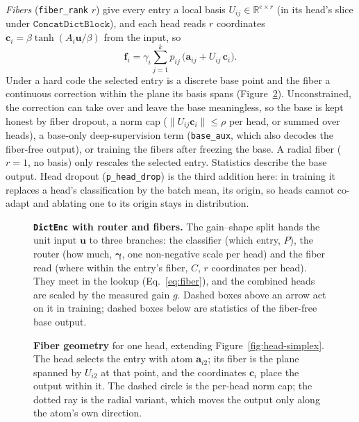 \emph{Fibers} (\texttt{fiber\_rank} $r$) give every entry a local basis
$U_{ij} \in \mathbb{R}^{e \times r}$ (in its head's slice under
$\mathtt{ConcatDictBlock}$), and each head reads $r$ coordinates
$\mathbf{c}_i = \beta\tanh(A_i\mathbf{u}/\beta)$ from the input, so
\begin{equation}
	\mathbf{f}_i = \gamma_i \sum^{k}_{j=1} p_{ij}\,\big(\mathbf{a}_{ij}
	      + U_{ij}\,\mathbf{c}_i\big).
	\label{eq:fiber}
\end{equation}
Under a hard code the selected entry is a discrete base point and the
fiber a continuous correction within the plane its basis spans
(Figure~\ref{fig:fiber}). Unconstrained, the correction can take over and
leave the base meaningless, so the base is kept honest by fiber dropout, a
norm cap ($\lVert U_{ij}\mathbf{c}_i\rVert \le \rho$ per head, or
summed over heads), a base-only deep-supervision term (\texttt{base\_aux},
which also decodes the fiber-free output), or training the fibers after
freezing the base. A radial fiber ($r{=}1$, no basis) only rescales the
selected entry. Statistics describe the base output. Head dropout
(\texttt{p\_head\_drop}) is the third addition here: in training it
replaces a head's classification by the batch mean, its origin, so heads
cannot co-adapt and ablating one to its origin stays in distribution.

\begin{figure}[tp]
\centering
\resizebox{\linewidth}{!}{}
\caption[\texttt{DictEnc} with router and fibers]{\textbf{\texttt{DictEnc}
	with router and fibers.} The gain--shape split hands the unit input
	$\mathbf{u}$ to three branches: the classifier (which entry, $P$),
	the router (how much, $\boldsymbol{\gamma}$, one non-negative scale per
	head) and the fiber read (where within the entry's fiber, $C$, $r$
	coordinates per head). They meet in the lookup
	(Eq.~\eqref{eq:fiber}), and the combined heads are scaled by the
	measured gain $g$. Dashed boxes above an arrow act on it in training;
	dashed boxes below are statistics of the fiber-free base output.}
\label{fig:dictenc-full}
\end{figure}

\begin{figure}[tp]
\centering

\caption[Fiber geometry]{\textbf{Fiber geometry} for one head, extending
	Figure~\ref{fig:head-simplex}. The head selects the entry with atom
	$\mathbf{a}_{i2}$; its fiber is the plane spanned by
	$U_{i2}$ at that point, and the coordinates $\mathbf{c}_i$ place the
	output within it. The dashed circle is the per-head norm cap; the
	dotted ray is the radial variant, which moves the output only along
	the atom's own direction.}
\label{fig:fiber}
\end{figure}


